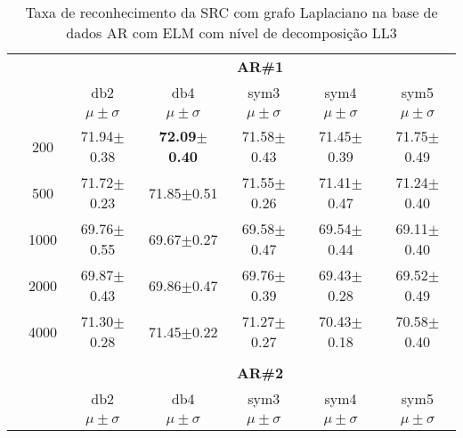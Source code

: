 \begin{table}[H]
	\centering
    \normalsize
	\caption{Taxa de reconhecimento da SRC com  grafo Laplaciano  na base de dados AR com ELM com nível de decomposição LL3}
		\begin{tabular}{|c|c|c c c c c|}
\cline{3-7}
\multicolumn{2}{c|}{\multirow{3}{*}{}} & \multicolumn{5}{c|}{\textbf{AR\#1}}   \\\cline{3-7} 
\multicolumn{2}{c|}{}  & db2 & db4 & sym3 & sym4 & sym5 \\\cline{3-7}%
\multicolumn{2}{c|}{}& $\mu \pm \sigma$ & $\mu \pm \sigma$ & $\mu \pm \sigma$ & $\mu \pm \sigma$ & $\mu \pm \sigma$ \\\hline
\multicolumn{1}{|c|}{ \multirow{5}{*}{\rotatebox[origin=c]{90}{\textbf{Neurônios}}} }

& 200 	&71.94$\pm$0.38	&\textbf{72.09$\pm$0.40}	&71.58$\pm$0.43	&71.45$\pm$0.39	&71.75$\pm$0.49	\\\cline{2-7}
& 500	&71.72$\pm$0.23	&71.85$\pm$0.51	&71.55$\pm$0.26	&71.41$\pm$0.47	&71.24$\pm$0.40	\\\cline{2-7}
& 1000	&69.76$\pm$0.55	&69.67$\pm$0.27	&69.58$\pm$0.47	&69.54$\pm$0.44	&69.11$\pm$0.40	\\\cline{2-7}
& 2000	&69.87$\pm$0.43	&69.86$\pm$0.47	&69.76$\pm$0.39	&69.43$\pm$0.28	&69.52$\pm$0.49	\\\cline{2-7}
& 4000	&71.30$\pm$0.28	&71.45$\pm$0.22	&71.27$\pm$0.27	&70.43$\pm$0.18	&70.58$\pm$0.40	


\\ \midrule
\multicolumn{7}{c}{}\\ 


\cline{3-7}
\multicolumn{2}{c|}{\multirow{3}{*}{}} & \multicolumn{5}{c|}{\textbf{AR\#2}}   \\\cline{3-7} 
\multicolumn{2}{c|}{}  & db2 & db4 & sym3 & sym4 & sym5 \\\cline{3-7}%
\multicolumn{2}{c|}{}& $\mu \pm \sigma$ & $\mu \pm \sigma$ & $\mu \pm \sigma$ & $\mu \pm \sigma$ & $\mu \pm \sigma$ \\\hline


\end{tabular}
\end{table}
